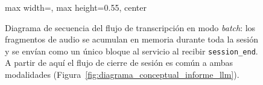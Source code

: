 \begin{figure}[htbp]
\begin{adjustbox}{max width=\linewidth, max height=0.55\textheight, center}
%
    \end{adjustbox}%
    \shorthandon{<>}
    \caption{Diagrama de secuencia del flujo de transcripción en modo \textit{batch}: los fragmentos de
        audio se acumulan en memoria durante toda la sesión y se envían como un único bloque al
        servicio  al recibir \texttt{session\_end}. A partir de aquí el flujo de
        cierre de sesión es común a ambas modalidades (Figura~\ref{fig:diagrama_conceptual_informe_llm}).}
    \label{fig:diagrama_conceptual_transcripcion_batch}
\end{figure}

